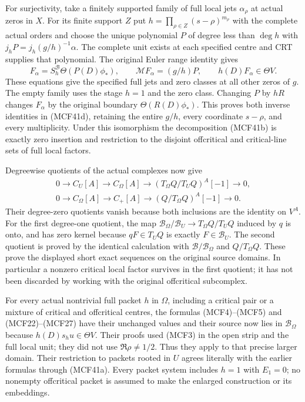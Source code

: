For surjectivity, take a finitely supported family of full local jets
$\alpha_\rho$ at actual zeros in $X$.  For its finite support $Z$ put
$h=\prod_{\rho\in Z}(s-\rho)^{m_\rho}$ with the complete actual
orders and choose the unique polynomial $P$ of degree less than
$\deg h$ with
$j_hP=j_h(g/h)^{-1}\alpha$.  The complete unit exists at each
specified centre and CRT supplies that polynomial.  The original
Euler range identity gives
\[
F_\alpha=S_h^{\mathscr B}\Theta(P(D)\phi_*),\qquad
\mathcal MF_\alpha=(g/h)P,\qquad h(D)F_\alpha\in\Theta V.
\tag{MCF41e}
\]
These equations give the specified full jets and zero classes at all
other zeros of $g$.  The empty family uses the stage $h=1$ and the
zero class.  Changing $P$ by $hR$ changes $F_\alpha$ by the original
boundary $\Theta(R(D)\phi_*)$.  This proves both inverse identities
in (MCF41d), retaining the entire $g/h$, every coordinate $s-\rho$,
and every multiplicity.  Under this isomorphism the decomposition
(MCF41b) is exactly zero insertion and restriction to the disjoint
offcritical and critical-line sets of full local factors.

Degreewise quotients of the actual complexes now give
\[
\begin{gathered}
0\longrightarrow C_U[A]\longrightarrow C_\Omega[A]
\longrightarrow (T_\Omega Q/T_UQ)^A[-1]\longrightarrow0,\\
0\longrightarrow C_\Omega[A]\longrightarrow C_+[A]
\longrightarrow (Q/T_\Omega Q)^A[-1]\longrightarrow0.
\end{gathered}
\tag{MCF41f}
\]
Their degree-zero quotients vanish because both inclusions are the
identity on $V^A$.  For the first degree-one quotient, the map
$\mathscr B_\Omega/\mathscr B_U\to T_\Omega Q/T_UQ$ induced by $q$
is onto, and has zero kernel because $qF\in T_UQ$ is exactly
$F\in\mathscr B_U$.  The second quotient is proved by the identical
calculation with $\mathscr B/\mathscr B_\Omega$ and $Q/T_\Omega Q$.
These prove the displayed short exact sequences on the original
source domains.  In particular a nonzero critical local factor
survives in the first quotient; it has not been discarded by working
with the original offcritical subcomplex.

For every actual nontrivial full packet $h$ in $\Omega$, including a
critical pair or a mixture of critical and offcritical centres,
the formulas (MCF4)--(MCF5) and (MCF22)--(MCF27) have their unchanged
values and their source now lies in $\mathscr B_\Omega$ because
$h(D)s_hu\in\Theta V$.  Their proofs used (MCF3) in the open strip
and the full local unit; they did not use $\Re\rho\ne1/2$.
Thus they apply to that precise larger domain.  Their restriction
to packets rooted in $U$ agrees literally with the earlier formulas
through (MCF41a).  Every packet system includes $h=1$ with $E_1=0$;
no nonempty offcritical packet is assumed to make the enlarged
construction or its embeddings.

